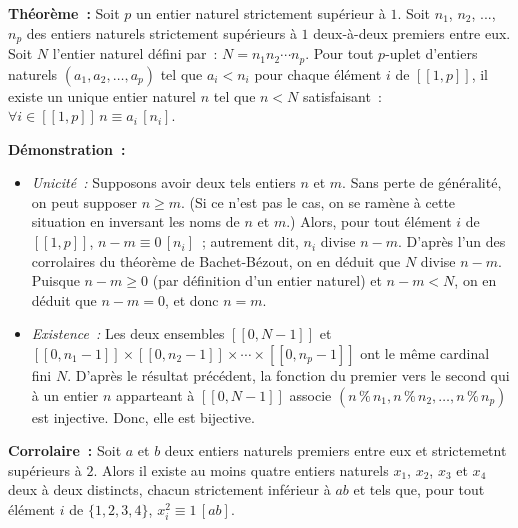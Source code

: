 \medskip

\noindent\textbf{Théorème :} Soit $p$ un entier naturel strictement supérieur à $1$. Soit $n_1$, $n_2$, ..., $n_p$ des entiers naturels strictement supérieurs à $1$ deux-à-deux premiers entre eux. 
Soit $N$ l'entier naturel défini par : $N = n_1 n_2 \cdots n_p$. 
Pour tout $p$-uplet d'entiers naturels $(a_1, a_2, \dots, a_p)$ tel que $a_i < n_i$ pour chaque élément $i$ de $[\![1,p]\!]$, il existe un unique entier naturel $n$ tel que $n < N$ satisfaisant : $\forall i \in [\![1,p]\!] \, n \equiv a_i \, [n_i]$.

\medskip

\noindent\textbf{Démonstration :} 
\begin{itemize}
    \item \textit{Unicité :} Supposons avoir deux tels entiers $n$ et $m$. 
    Sans perte de généralité, on peut supposer $n \geq m$. 
    (Si ce n'est pas le cas, on se ramène à cette situation en inversant les noms de $n$ et $m$.)
    Alors, pour tout élément $i$ de $[\![1,p]\!]$, $n-m \equiv 0 \, [n_i]$ ; autrement dit, $n_i$ divise $n-m$. 
    D'après l'un des corrolaires du théorème de Bachet-Bézout, on en déduit que $N$ divise $n-m$. 
    Puisque $n-m \geq 0$ (par définition d'un entier naturel) et $n-m < N$, on en déduit que $n-m=0$, et donc $n=m$.
    \item \textit{Existence :} Les deux ensembles $[\![0, N-1]\!]$ et $[\![0, n_1-1]\!] \times [\![0, n_2-1]\!] \times \cdots \times [\![0, n_p-1]\!]$ ont le même cardinal fini $N$. D'après le résultat précédent, la fonction du premier vers le second qui à un entier $n$ apparteant à $[\![0,N-1]\!]$ associe $(n \mathrel{\%} n_1, n \mathrel{\%} n_2, \dots, n \mathrel{\%} n_p)$ est injective. Donc, elle est bijective.
\end{itemize}

\done

\medskip

\noindent\textbf{Corrolaire :} Soit $a$ et $b$ deux entiers naturels premiers entre eux et strictemetnt supérieurs à $2$. Alors il existe au moins quatre entiers naturels $x_1$, $x_2$, $x_3$ et $x_4$ deux à deux distincts, chacun strictement inférieur à $ab$ et tels que, pour tout élément $i$ de $\lbrace 1, 2, 3, 4 \rbrace$, $x_i^2 \equiv 1 \, [a b]$.

\medskip

